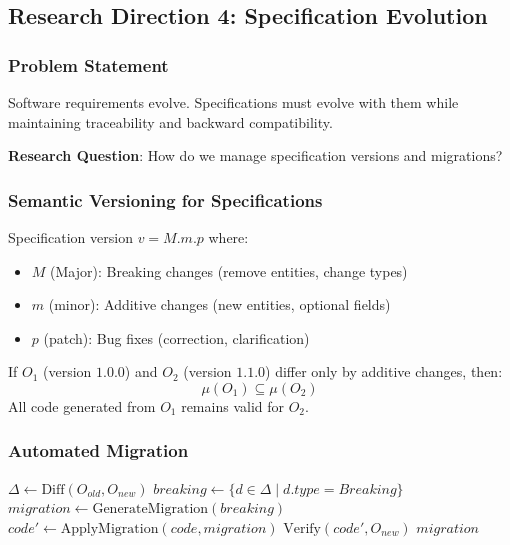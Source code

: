 \subsection{Research Direction 4: Specification Evolution}

\subsubsection{Problem Statement}

Software requirements evolve. Specifications must evolve with them while maintaining traceability and backward compatibility.

\textbf{Research Question}: How do we manage specification versions and migrations?

\subsubsection{Semantic Versioning for Specifications}

\begin{definition}
    Specification version $v = M.m.p$ where:
    \begin{itemize}
        \item $M$ (Major): Breaking changes (remove entities, change types)
        \item $m$ (minor): Additive changes (new entities, optional fields)
        \item $p$ (patch): Bug fixes (correction, clarification)
    \end{itemize}
\end{definition}

\begin{theorem}
    If $O_1$ (version $1.0.0$) and $O_2$ (version $1.1.0$) differ only by additive changes, then:
    \begin{equation}
        \mu(O_1) \subseteq \mu(O_2)
    \end{equation}
    All code generated from $O_1$ remains valid for $O_2$.
\end{theorem}

\subsubsection{Automated Migration}

\begin{algorithm}
\caption{Specification Migration}
\begin{algorithmic}[1]
    \State $\Delta \gets \text{Diff}(O_{old}, O_{new})$
    \State $breaking \gets \{d \in \Delta \mid d.type = Breaking\}$
    \State $migration \gets \text{GenerateMigration}(breaking)$
        \State $code' \gets \text{ApplyMigration}(code, migration)$
        \State $\text{Verify}(code', O_{new})$
    \EndFor
    \State \Return $migration$
\EndProcedure
\end{algorithmic}
\end{algorithm}

